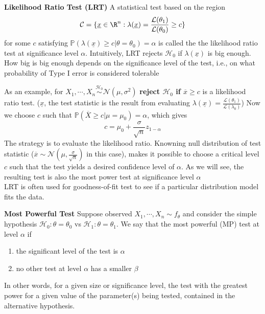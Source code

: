 \documentclass[11pt]{article}
\begin{document}
\begin{defn*}
  \textbf{Likelihood Ratio Test (LRT)} A statistical test based on the region
  \[
    \mathcal{C} = \{ \underline{x}\in\R^n : \lambda(\underline{x}) = \frac{\mathcal{L}(\theta_1)}{\mathcal{L}(\theta_0)} \geq c \}
  \]
  for some $c$ satisfying $\mathbb{P}(\lambda(\underline{x}) \geq c | \theta = \theta_0) = \alpha$ is called the the likelihood ratio test at significance level $\alpha$. Intuitively, LRT rejects $\mathcal{H}_0$ if $\lambda(\underline{x})$ is big enough. How big is big enough depends on the significance level of the test, i.e., on what probability of Type I error is considered tolerable
  \begin{rem}
    As an example, for $X_1, \cdots, X_n \stackrel{\mathcal{H}_0}{\sim} \mathcal{N}(\mu, \sigma^2)$ \quad \textbf{reject $\mathcal{H}_0$ if $\overline{x}\geq c$} \quad  is a likelihood ratio test. ($\underline{x}$, the test statistic is the result from evaluating $\lambda(\underline{x}) = \frac{\mathcal{L}(\theta_1)}{\mathcal{L}(\lambda_0)}$) Now we choose $c$ such that $\mathbb{P}(\overline{X} \geq c | \mu =\mu_0) = \alpha$, which gives
    \[
      c = \mu_0 + \frac{\sigma}{\sqrt{n}} z_{1 - \alpha}
    \]
    The strategy is to evaluate the likelihood ratio. Knowning null distribution of test statistic ($\overline{x} \sim \mathcal{N}(\mu, \frac{\sigma}{\sqrt{n}})$ in this case), makes it possible to choose a critical level $c$ such that the test yields a desired confidence level of $\alpha$. As we will see, the resulting test is also the most power test at significance level $\alpha$\\
    LRT is often used for goodness-of-fit test to see if a particular distribution model fits the data.
  \end{rem}
\end{defn*}

\begin{defn*}
  \textbf{Most Powerful Test} Suppose observed $X_1, \cdots, X_n \sim f_{\theta}$ and consider the simple hypothesis $\mathcal{H}_0: \theta = \theta_0$ vs $\mathcal{H}_1: \theta = \theta_1$. We say that the most powerful (MP) test at level $\alpha$ if
  \begin{enumerate}
    \item the significant level of the test is $\alpha$
    \item no other test at level $\alpha$ has a smaller $\beta$
  \end{enumerate}
  In other words, for a given size or significance level, the test with the greatest power for a given value of the parameter(s) being tested, contained in the alternative hypothesis.
\end{defn*}
\end{document}

